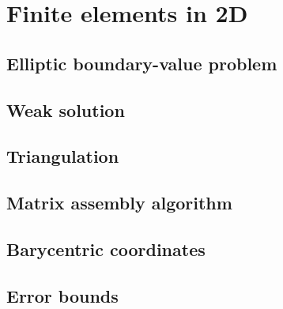 \chapter{Finite elements in 2D}

\section{Elliptic boundary-value problem}

\section{Weak solution}

\section{Triangulation}

\section{Matrix assembly algorithm}

\section{Barycentric coordinates}

\section{Error bounds}
